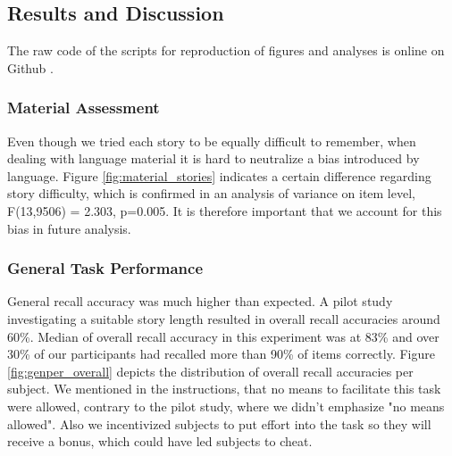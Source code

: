 \documentclass[a4paper,man,natbib,floatsintext,import]{apa6}
\begin{document}
\subsection{Results and Discussion}
The raw code of the scripts for reproduction of figures and analyses is online on Github \citep{Oesch2016}.

\subsubsection{Material Assessment}
Even though we tried each story to be equally difficult to remember, when dealing with language material it is hard to neutralize a bias introduced by language. Figure \ref{fig:material_stories} indicates a certain difference regarding story difficulty, which is confirmed in an analysis of variance on item level, F(13,9506) = 2.303, p=0.005. It is therefore important that we account for this bias in future analysis.

\subsubsection{General Task Performance}
General recall accuracy was much higher than expected. A pilot study investigating a suitable story length resulted in overall recall accuracies around 60\%. Median of overall recall accuracy in this experiment was at 83\% and over 30\% of our participants had recalled more than 90\% of items correctly. Figure \ref{fig:genper_overall} depicts the distribution of overall recall accuracies per subject. We mentioned in the instructions, that no means to facilitate this task were allowed, contrary to the pilot study, where we didn't emphasize "no means allowed". Also we incentivized subjects to put effort into the task so they will receive a bonus, which could have led subjects to cheat.
\end{document}
